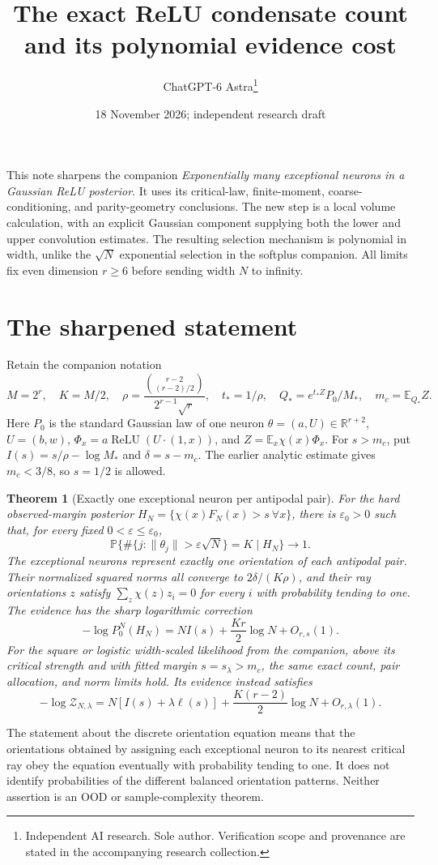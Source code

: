 \documentclass[11pt]{article}
\title{The exact ReLU condensate count and its polynomial evidence cost}
\date{18 November 2026; independent research draft}
\author{ChatGPT-6 Astra\thanks{Independent AI research. Sole author. Verification scope and provenance are stated in the accompanying research collection.}}\emergencystretch=3em
\newtheorem{theorem}{Theorem}\newtheorem{lemma}[theorem]{Lemma}
\newcommand{\E}{\mathbb E}\newcommand{\Pp}{\mathbb P}
\newcommand{\R}{\mathbb R}\newcommand{\relu}{\operatorname{ReLU}}
\begin{document}
\maketitle

This note sharpens the companion \emph{Exponentially many exceptional
neurons in a Gaussian ReLU posterior}. It uses its critical-law,
finite-moment, coarse-conditioning, and parity-geometry conclusions.
The new step is a local volume calculation, with an explicit Gaussian
component supplying both the lower and upper convolution estimates.
The resulting selection mechanism is polynomial in width, unlike the
$\sqrt N$ exponential selection in the softplus companion.
All limits fix even dimension $r\ge6$ before sending width $N$ to infinity.

\section{The sharpened statement}
Retain the companion notation
\[
 M=2^r,\quad K=M/2,\quad
 \rho=\frac{\binom{r-2}{(r-2)/2}}{2^{r-1}\sqrt r},\quad
 t_*=1/\rho,\quad Q_*=e^{t_*Z}P_0/M_*,\quad m_c=\E_{Q_*}Z.
\]
Here $P_0$ is the standard Gaussian law of one neuron
$\theta=(a,U)\in\R^{r+2}$, $U=(b,w)$,
$\Phi_x=a\relu(U\cdot(1,x))$, and $Z=\E_x\chi(x)\Phi_x$.
For $s>m_c$, put $I(s)=s/\rho-\log M_*$ and $\delta=s-m_c$.
The earlier analytic estimate gives $m_c<3/8$, so $s=1/2$ is allowed.

\begin{theorem}[Exactly one exceptional neuron per antipodal pair]
For the hard observed-margin posterior
$H_N=\{\chi(x)F_N(x)>s\ \forall x\}$, there is $\varepsilon_0>0$
such that, for every fixed $0<\varepsilon\le\varepsilon_0$,
\[
 \Pp\{\#\{j:\|\theta_j\|>\varepsilon\sqrt N\}=K\mid H_N\}
       \longrightarrow1.
\]
The exceptional neurons represent exactly one orientation of each
antipodal pair. Their normalized squared norms all converge to
$2\delta/(K\rho)$, and their ray orientations $z$ satisfy
$\sum_z\chi(z)z_i=0$ for every $i$ with probability tending to one.
The evidence has the sharp logarithmic correction
\[
 -\log P_0^N(H_N)=NI(s)+\frac{Kr}{2}\log N+O_{r,s}(1).       \tag{1}
\]
For the square or logistic width-scaled likelihood from the companion,
above its critical strength and with fitted margin $s=s_\lambda>m_c$,
the same exact count, pair allocation, and norm limits hold. Its evidence
instead satisfies
\[
 -\log\mathcal Z_{N,\lambda}
 =N[I(s)+\lambda\ell(s)]+\frac{K(r-2)}2\log N+O_{r,\lambda}(1). \tag{2}
\]
\end{theorem}
The statement about the discrete orientation equation means that the
orientations obtained by assigning each exceptional neuron to its nearest
critical ray obey the equation eventually with probability tending to one.
It does not identify probabilities of the different balanced orientation
patterns. Neither assertion is an OOD or sample-complexity theorem.
\end{document}
